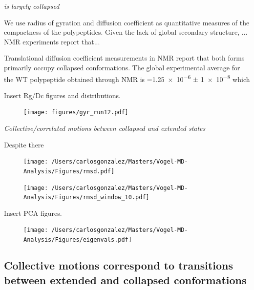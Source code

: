 {\it \gct{} is largely collapsed}

We use radius of gyration and diffusion coefficient as quantitative measures of the compactness of the polypeptides. Given the lack of global secondary structure, ... NMR experiments report that...

Translational diffusion coefficient measurements in NMR report that both \gct{} forms primarily occupy collapsed conformations. The global experimental average for the WT polypeptide obtained through NMR is \diffusion{}=\num{1.25e-6} $\pm$  \SI{1e-8}{\dcunits} which 

Insert Rg/Dc figures and distributions.

\begin{figure}
	\texttt{[image: figures/gyr\_run12.pdf]}

\end{figure}

{\it Collective/correlated motions between collapsed and extended states}

Despite there 

\begin{figure}
\centering
\texttt{[image: /Users/carlosgonzalez/Masters/Vogel-MD-Analysis/Figures/rmsd.pdf]}
\label{eigenvalues}
\end{figure}

\begin{figure}
\centering
\texttt{[image: /Users/carlosgonzalez/Masters/Vogel-MD-Analysis/Figures/rmsd\_window\_10.pdf]}
\label{eigenvalues}
\end{figure}

Insert PCA figures.

\begin{figure}
\centering
\texttt{[image: /Users/carlosgonzalez/Masters/Vogel-MD-Analysis/Figures/eigenvals.pdf]}
\label{eigenvalues}
\end{figure}

\subsection{Collective motions correspond to transitions between extended and collapsed conformations}

